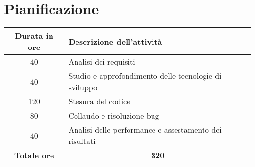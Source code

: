 \section{Pianificazione}\label{sec:pianificazione}
\begin{tabularx}{\textwidth}{|c|X|}
    \hline
    \textbf{Durata in ore} & \textbf{Descrizione dell'attività} \\\hline
    40 & Analisi dei requisiti \\\hline
    40 & Studio e approfondimento delle tecnologie di sviluppo \\\hline
    120 & Stesura del codice \\\hline
    80 & Collaudo e risoluzione bug \\\hline
    40 & Analisi delle performance e assestamento dei risultati \\\hline
    \textbf{Totale ore} & \multicolumn{1}{|c|}{\textbf{320}} \\\hline
\end{tabularx}